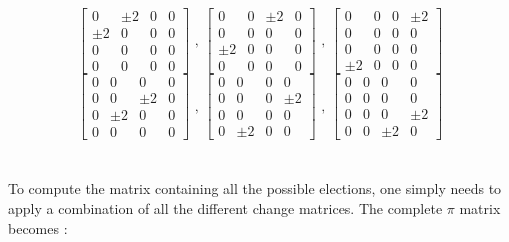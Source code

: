 $$ \begin{bmatrix}
0 & \pm 2 & 0 & 0 \\
\pm 2 & 0 & 0 & 0 \\
0 & 0 & 0 & 0 \\
0 & 0 & 0 & 0 
\end{bmatrix} \text{ , }
\begin{bmatrix}
0 & 0 &\pm 2 &  0 \\
0 & 0 & 0 & 0 \\
\pm 2 & 0 & 0 & 0 \\
0 & 0 & 0 & 0 
\end{bmatrix}\text{ , }
\begin{bmatrix}
0 & 0 & 0 & \pm 2 \\
0 & 0 & 0 & 0 \\
0 & 0 & 0 & 0 \\
\pm 2 & 0 & 0 & 0 
\end{bmatrix}$$
$$
\begin{bmatrix}
0 & 0 & 0 & 0 \\
0 & 0 & \pm 2 & 0 \\
0 & \pm 2 & 0 & 0 \\
0 & 0 & 0 & 0 
\end{bmatrix} \text{ , }
\begin{bmatrix}
0 & 0 & 0 & 0 \\
0 & 0  & 0 & \pm 2\\
0 &0 &  0 & 0 \\
0 & \pm 2 & 0 & 0 
\end{bmatrix} \text{ , }
\begin{bmatrix}
0 & 0 & 0 & 0 \\
0 & 0 & 0 & 0 \\
0 & 0 & 0 & \pm 2 \\
0 & 0 & \pm 2 & 0 
\end{bmatrix} $$ \\\\

To compute the matrix containing all the possible elections, one simply needs to apply a combination of all the different change matrices. The complete $\pi$ matrix becomes :

